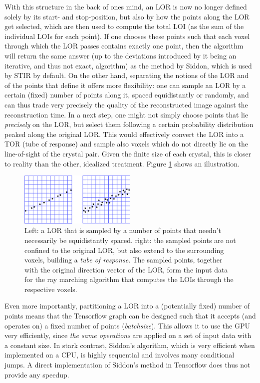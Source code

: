 \documentclass[a4paper, 11pt]{article}
\begin{document}
  With this structure in the back of ones mind, an LOR is now no longer defined solely by its start- and stop-position, but also by how the points along the LOR get selected, which are then used to compute the total LOI (as the sum of the individual LOIs for each point). If one chooses these points such that each voxel through which the LOR passes contains exactly one point, then the algorithm will return the same answer (up to the deviations introduced by it being an iterative, and thus not exact, algorithm) as the method by Siddon, which is used by STIR by default. On the other hand, separating the notions of the LOR and of the points that define it offers more flexibility: one can sample an LOR by a certain (fixed) number of points along it, spaced equidistantly or randomly, and can thus trade very precisely the quality of the reconstructed image against the reconstruction time. In a next step, one might not simply choose points that lie \textsl{precisely} on the LOR, but select them following a certain probability distribution peaked along the original LOR. This would effectively convert the LOR into a TOR (tube of response) and sample also voxels which do not directly lie on the line-of-sight of the crystal pair. Given the finite size of each crystal, this is closer to reality than the other, idealized treatment. Figure \ref{sampling} shows an illustration.
  \begin{figure}
    \centering
    \includegraphics[width = 0.5\textwidth]{../LORTORcombined.pdf}
    \caption{Left: a LOR that is sampled by a number of points that needn't necessarily be equidistantly spaced. right: the sampled points are not confined to the original LOR, but also extend to the surrounding voxels, building a \textsl{tube of response}. The sampled points, together with the original direction vector of the LOR, form the input data for the ray marching algorithm that computes the LOIs through the respective voxels.}
    \label{sampling}
  \end{figure}

  Even more importantly, partitioning a LOR into a (potentially fixed) number of points means that the Tensorflow graph can be designed such that it accepts (and operates on) a fixed number of points (\textsl{batchsize}). This allows it to use the GPU very efficiently, since \textsl{the same operations} are applied on a set of input data with a constant size. In stark contrast, Siddon's algorithm, which is very efficient when implemented on a CPU, is highly sequential and involves many conditional jumps. A direct implementation of Siddon's method in Tensorflow does thus not provide any speedup.
\end{document}
